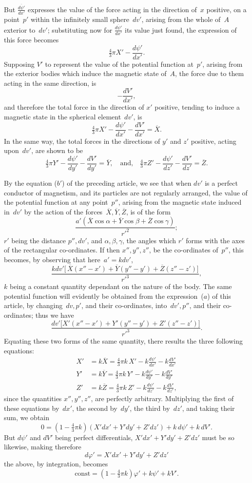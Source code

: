 \documentclass[12pt,notitlepage]{amsart}
\renewcommand{\phi}{\varphi}
\begin{document}
But $\frac{\overline{d\psi'}}{dx'}$ expresses the value
of the force acting in the direction
of~$x$ positive, on a point~$p'$ within the infinitely small sphere~$dv'$, arising from
the whole of~$A$ exterior to~$dv'$;
substituting now for $\frac{\overline{d\psi'}}{dx'}$ its value just found,
the expression of this force becomes
\[
\tfrac43\pi X'-\frac{{d\psi'}}{dx'}.
\]
Supposing $V'$ to represent the value of the potential function at~$p'$, arising
from the exterior bodies which induce the magnetic state of~$A$, the force due
to them acting in the same direction, is
\[
-\frac{dV'}{dx'},
\]
and therefore the total force in the direction of $x'$ positive,
tending to induce
a magnetic state in the spherical element~$dv'$, is
\[
\tfrac43\pi X'-\frac{{d\psi'}}{dx'}-\frac{dV'}{dx'}
=\overline{X}.
\]
In the same way, the total forces in the directions of $y'$ and $z'$ positive,
acting upon~$dv'$, are shown to be
\[
\tfrac43\pi Y'-\frac{{d\psi'}}{dy'}-\frac{dV'}{dy'}=\overline{Y},
\quad\text{and,}\quad
\tfrac43\pi Z'-\frac{{d\psi'}}{dz'}-\frac{dV'}{dz'}=\overline{Z}.
\]

By the equation ($b'$) of the preceding article, we see that when $dv'$
is a perfect conductor of magnetism,
and its particles are not regularly arranged,
the value of the potential function at any point~$p''$,
arising from the magnetic
state induced in~$dv'$ by the action of the
forces~$\overline{X},\overline{Y},\overline{Z}$, is of the form
\[
\frac{a'(\overline{X}\cos\alpha+\overline{Y}\cos\beta+\overline{Z}\cos\gamma)}
{r'^2};
\]
$r'$ being the distance $p'',dv'$, and
$\alpha,\beta,\gamma$, the angles which $r'$ forms with
the axes of the rectangular co-ordinates. If then $x'',y'',z''$, be the
co-ordinates of~$p''$, this becomes, by observing that here~${a'=kdv'}$,
\[
\frac{kdv'\bigl[\,
\overline{X}(x''-x')+\overline{Y}(y''-y')+\overline{Z}(z''-z')
\bigr]}{r'^3},
\]
$k$ being a constant quantity dependant on the nature of the body. The same
potential function will evidently be obtained from the expression~($a$) of this
article, by changing~$dv,p'$, and their co-ordinates, into~$dv',p''$, and their
co-ordinates; thus we have
\[
\frac{dv'\bigl[
X'(x''-x')+Y'(y''-y')+Z'(z''-z')
\bigr]}{r'^3}.
\]
Equating these two forms of the same quantity, there results the three following
equations:
\[
\begin{aligned}
X'&=k\overline{X}=\tfrac43\pi k\,X'-k\frac{d\psi'}{dx'}-k\frac{dV'}{dx'}\\
Y'&=k\overline{Y}=\tfrac43\pi k\,Y'-k\frac{d\psi'}{dy'}-k\frac{dV'}{dy'}\\
Z'&=k\overline{Z}=\tfrac43\pi k\,Z'-k\frac{d\psi'}{dz'}-k\frac{dV'}{dz'},
\end{aligned}
\]
since the quantities $x'',y'',z''$, are perfectly arbitrary.
Multiplying the first
of these equations by~$dx'$, the second by~$dy'$,
the third by~$dz'$, and taking
their sum, we obtain
\[
0=(1-\tfrac43\pi k)(X'dx'+Y'dy'+Z'dz')+k\,d\psi'+k\,dV'.
\]
But $d\psi'$ and $dV'$ being perfect differentials,
$X'dx'+Y'dy'+Z'dz'$ must be
so likewise, making therefore
\[
d\phi'=X'dx'+Y'dy'+Z'dz'
\]
the above, by integration, becomes
\[
\text{const}=(1-\tfrac43\pi k)\phi'+k\psi'+kV'.
\]
\end{document}

